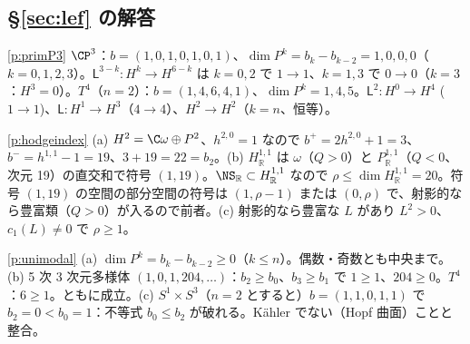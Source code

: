 \subsection*{\S\ref{sec:lef} の解答}
\begin{sol}{\ref{p:primP3}}
$\CP^3$：$b=(1,0,1,0,1,0,1)$、$\dim P^k=b_k-b_{k-2}=1,0,0,0$（$k=0,1,2,3$）。$\mathsf L^{3-k}:H^k\to H^{6-k}$ は $k=0,2$ で $1\to1$、$k=1,3$ で $0\to0$（$k=3$：$H^3=0$）。$T^4$（$n=2$）：$b=(1,4,6,4,1)$、$\dim P^k=1,4,5$。$\mathsf L^2:H^0\to H^4$ ($1\to1$)、$\mathsf L:H^1\to H^3$（$4\to4$）、$H^2\to H^2$（$k=n$、恒等）。
\end{sol}
\begin{sol}{\ref{p:hodgeindex}}
(a) $H^2=\C\omega\oplus P^2$、$h^{2,0}=1$ なので $b^+=2h^{2,0}+1=3$、$b^-=h^{1,1}-1=19$、$3+19=22=b_2$。(b) $H^{1,1}_{\mathbb R}$ は $\omega$（$Q>0$）と $P^{1,1}_{\mathbb R}$（$Q<0$、次元 19）の直交和で符号 $(1,19)$。$\NS_{\mathbb R}\subset H^{1,1}_{\mathbb R}$ なので $\rho\le\dim H^{1,1}_{\mathbb R}=20$。符号 $(1,19)$ の空間の部分空間の符号は $(1,\rho-1)$ または $(0,\rho)$ で、射影的なら豊富類（$Q>0$）が入るので前者。(c) 射影的なら豊富な $L$ があり $L^2>0$、$c_1(L)\ne0$ で $\rho\ge1$。
\end{sol}
\begin{sol}{\ref{p:unimodal}}
(a) $\dim P^k=b_k-b_{k-2}\ge0$（$k\le n$）。偶数・奇数とも中央まで。(b) 5 次 3 次元多様体 $(1,0,1,204,\ldots)$：$b_2\ge b_0$、$b_3\ge b_1$ で $1\ge1$、$204\ge0$。$T^4$：$6\ge1$。ともに成立。(c) $S^1\times S^3$（$n=2$ とすると）$b=(1,1,0,1,1)$ で $b_2=0<b_0=1$：不等式 $b_0\le b_2$ が破れる。Kähler でない（Hopf 曲面）ことと整合。
\end{sol}

